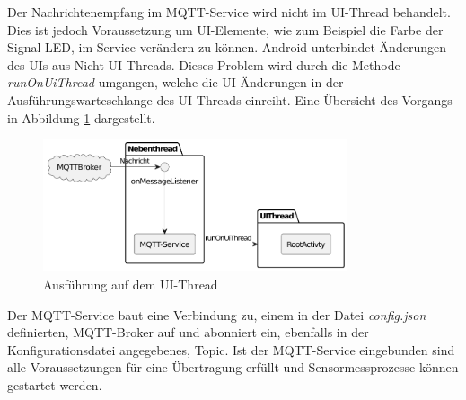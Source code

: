 \documentclass[11pt,a4paper]{report}
\begin{document}
Der Nachrichtenempfang im MQTT-Service wird nicht im UI-Thread behandelt.
Dies ist jedoch Voraussetzung um UI-Elemente, wie zum Beispiel die Farbe der Signal-LED, im Service verändern zu können.
Android unterbindet Änderungen des UIs aus Nicht-UI-Threads.
Dieses Problem wird durch die Methode \textit{runOnUiThread} umgangen, welche die UI-Änderungen in der Ausführungswarteschlange des UI-Threads einreiht.
Eine Übersicht des Vorgangs in Abbildung \ref{fig:runOnUiThread} dargestellt.
\begin{figure}[htbp]
  \centering
  \includegraphics[width=0.8\textwidth]{images/runOnUiThread.pdf}
  \caption{Ausführung auf dem UI-Thread}
  \label{fig:runOnUiThread}
\end{figure}
Der MQTT-Service baut eine Verbindung zu, einem in der Datei \textit{config.json} definierten, MQTT-Broker auf und abonniert ein, ebenfalls in der Konfigurationsdatei angegebenes, Topic.
Ist der MQTT-Service eingebunden sind alle Voraussetzungen für eine Übertragung erfüllt und Sensormessprozesse können gestartet werden.
\end{document}
